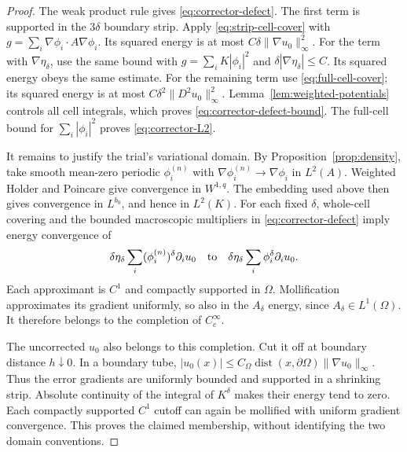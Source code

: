 \documentclass[11pt,a4paper]{article}
\numberwithin{equation}{section}
\theoremstyle{definition}
\theoremstyle{remark}\newtheorem{remark}[theorem]{Remark}
\DeclareMathOperator{\dist}{dist}
\newcommand{\norm}[1]{\lVert #1\rVert}
\begin{document}
\begin{proof}
The weak product rule gives \eqref{eq:corrector-defect}.
The first term is supported in the \(3\delta\) boundary strip.
Apply \eqref{eq:strip-cell-cover} with
\(g=\sum_i\nabla\phi_i\cdot A\nabla\phi_i\).
Its squared energy is at most
\(C\delta\norm{\nabla u_0}_\infty^2\).
For the term with \(\nabla\eta_\delta\), use the same bound
with \(g=\sum_iK|\phi_i|^2\) and
\(\delta|\nabla\eta_\delta|\leq C\).
Its squared energy obeys the same estimate.
For the remaining term use \eqref{eq:full-cell-cover};
its squared energy is at most
\(C\delta^2\norm{D^2u_0}_\infty^2\).
Lemma~\ref{lem:weighted-potentials} controls all cell integrals,
which proves \eqref{eq:corrector-defect-bound}.
The full-cell bound for \(\sum_i|\phi_i|^2\) proves
\eqref{eq:corrector-L2}.

It remains to justify the trial's variational domain.
By Proposition~\ref{prop:density}, take smooth mean-zero
periodic \(\phi_i^{(n)}\) with
\(\nabla\phi_i^{(n)}\to\nabla\phi_i\) in \(L^2(A)\).
Weighted Holder and Poincare give convergence in \(W^{1,q}\).
The embedding used above then gives convergence in \(L^{b_0}\),
and hence in \(L^2(K)\). For each fixed \(\delta\), whole-cell
covering and the bounded macroscopic multipliers in
\eqref{eq:corrector-defect} imply energy convergence of
\[
 \delta\eta_\delta\sum_i(\phi_i^{(n)})^\delta\partial_i u_0
 \quad\hbox{to}\quad
 \delta\eta_\delta\sum_i\phi_i^\delta\partial_i u_0 .
\]
Each approximant is \(C^1\) and compactly supported in \(\Omega\).
Mollification approximates its gradient uniformly, so also in
the \(A_\delta\) energy, since \(A_\delta\in L^1(\Omega)\).
It therefore belongs to the completion of \(C_c^\infty\).

The uncorrected \(u_0\) also belongs to this completion.
Cut it off at boundary distance \(h\downarrow0\).
In a boundary tube,
\(|u_0(x)|\leq C_\Omega\dist(x,\partial\Omega)
\norm{\nabla u_0}_\infty\).
Thus the error gradients are uniformly bounded and supported
in a shrinking strip. Absolute continuity of the integral of
\(K^\delta\) makes their energy tend to zero.
Each compactly supported \(C^1\) cutoff can again be mollified
with uniform gradient convergence. This proves the claimed
membership, without identifying the two domain conventions.
\end{proof}
\end{document}
